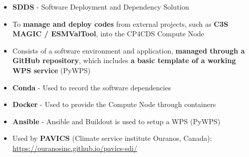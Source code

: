 \documentclass[landscape,a0paper,fontscale=0.4]{baposter} %
\newcommand{\compresslist}{%
\setlength{\itemsep}{1pt}%
\setlength{\parskip}{0pt}%
\setlength{\parsep}{0pt}%
}
\begin{document}
\begin{poster}
{    %
    \begin{itemize}\compresslist
      \item {\bf SDDS} - Software Deployment and Dependency Solution
      \item To {\bf manage and deploy codes} from external projects,
        such as {\bf C3S MAGIC / ESMValTool}, into the CP4CDS Compute Node
      \item Consists of a software environment and application, {\bf managed through a GitHub repository},
        which includes {\bf a basic template of a working WPS service} (PyWPS)
      \item {\bf Conda} - Used to record the software dependencies
      \item {\bf Docker} - Used to provide the Compute Node through containers
      \item {\bf Ansible} - Ansible and Buildout is used to setup a WPS (PyWPS) %
      \item Used by {\bf PAVICS} (Climate service institute Ouranos, Canada):\\
        \url{https://ouranosinc.github.io/pavics-sdi/}
    \end{itemize}

}


\end{poster}
\end{document}
